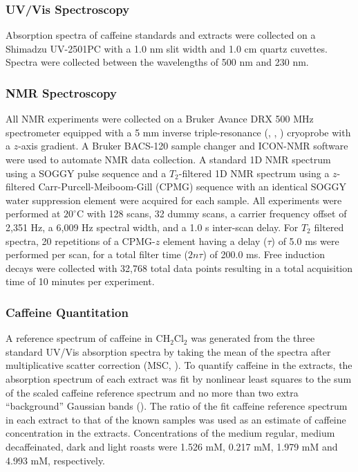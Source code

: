 \subsubsection{UV/Vis Spectroscopy}

\begin{doublespace}
Absorption spectra of caffeine standards and extracts were collected on a
Shimadzu UV-2501PC with a 1.0 nm slit width and 1.0 cm quartz cuvettes. Spectra
were collected between the wavelengths of 500 nm and 230 nm.
\end{doublespace}

\subsubsection{NMR Spectroscopy}

\begin{doublespace}
All NMR experiments were collected on a Bruker Avance DRX 500 MHz spectrometer
equipped with a 5 mm inverse triple-resonance (\hnmr{}, \cnmr{}, \nnmr{})
cryoprobe with a $z$-axis gradient. A Bruker BACS-120 sample changer and
ICON-NMR software were used to automate NMR data collection. A standard 1D
\hnmr{} NMR spectrum using a SOGGY pulse sequence
\cite{hwang:jmr1995,nguyen:jmr2007} and a $T_2$-filtered 1D \hnmr{} NMR
spectrum using a $z$-filtered Carr-Purcell-Meiboom-Gill (CPMG) sequence
\cite{rastrelli:jacs2009} with an identical SOGGY water suppression element
were acquired for each sample. All experiments were performed at $20^\circ$C
with 128 scans, 32 dummy scans, a carrier frequency offset of 2,351 Hz, a
6,009 Hz spectral width, and a 1.0 s inter-scan delay. For $T_2$ filtered
spectra, 20 repetitions of a CPMG-$z$ element having a delay ($\tau$) of 5.0
ms were performed per scan, for a total filter time ($2n\tau$) of 200.0 ms.
Free induction decays were collected with 32,768 total data points resulting
in a total acquisition time of 10 minutes per experiment.
\end{doublespace}

\subsubsection{Caffeine Quantitation}

\begin{doublespace}
A reference spectrum of caffeine in CH$_2$Cl$_2$ was generated from the three
standard UV/Vis absorption spectra by taking the mean of the spectra after
multiplicative scatter correction (MSC, \cite{fearn:cils2009}). To quantify
caffeine in the extracts, the absorption spectrum of each extract was fit by
nonlinear least squares \cite{marquardt:jsiam1963} to the sum of the scaled
caffeine reference spectrum and no more than two extra ``background'' Gaussian
bands (). The ratio of the fit caffeine reference
spectrum in each extract to that of the known samples was used as an estimate
of caffeine concentration in the extracts. Concentrations of the medium
regular, medium decaffeinated, dark and light roasts were
1.526 mM, 0.217 mM, 1.979 mM and 4.993 mM, respectively.
\end{doublespace}

